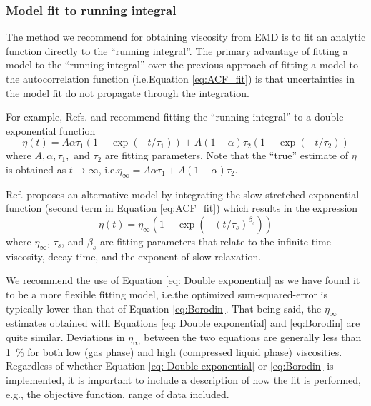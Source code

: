 \documentclass[9pt,bestpractices]{livecoms}
\providecommand{\DIFadd}[1]{{\protect\color{blue}\uwave{#1}}} %
\providecommand{\DIFaddbegin}{} %
\providecommand{\DIFaddend}{} %
\begin{document}
%
%

%

\subsubsection*{Model fit to running integral}

The method we recommend for obtaining viscosity from EMD is to fit an analytic function directly to the ``running integral''. The primary advantage of fitting a model to the ``running integral'' over the previous approach of fitting a model to the autocorrelation function (i.e.\DIFaddbegin \DIFadd{, }\DIFaddend Equation \ref{eq:ACF_fit}) is that uncertainties in the model fit do not propagate through the integration. 

For example, Refs. \cite{ReyCastro2006} and \cite{Zhang2015} recommend fitting the ``running integral'' to a double-exponential function \begin{equation} \label{eq: Double exponential}
\eta(t) = A \alpha \tau_1 \left(1-\exp{(-t/\tau_1)}\right) + A (1-\alpha) \tau_2 \left(1-\exp{(-t/\tau_2)}\right)
\end{equation}
where $A, \alpha, \tau_1, $ and $\tau_2$ are fitting parameters. Note that the ``true'' estimate of $\eta$ is obtained as $t \to \infty$, i.e.\DIFaddbegin \DIFadd{, }\DIFaddend $\eta_\infty = A \alpha \tau_1 + A (1-\alpha) \tau_2$. 

Ref. \cite{Borodin2009} proposes an alternative model by integrating the slow stretched-exponential function (second term in Equation \ref{eq:ACF_fit}) which results in the expression
\begin{equation} \label{eq:Borodin}
\eta(t) = \eta_\infty (1- \exp(-(t/\tau_s)^{\beta_s}))
\end{equation}
where $\eta_\infty$, $\tau_s$, and $\beta_s$ are fitting parameters that relate to the infinite-time viscosity, decay time, and the exponent of slow relaxation. 

We recommend the use of Equation \ref{eq: Double exponential} as we have found it to be a more flexible fitting model, i.e.\DIFaddbegin \DIFadd{, }\DIFaddend the optimized sum-squared-error is typically lower than that of Equation \ref{eq:Borodin}. That being said, the $\eta_{\infty}$ estimates obtained with Equations \ref{eq: Double exponential} and \ref{eq:Borodin} are quite similar. Deviations in $\eta_{\infty}$ between the two equations are generally less than 1~\% for both low (gas phase) and high (compressed liquid phase) viscosities. Regardless of whether Equation \ref{eq: Double exponential} or \ref{eq:Borodin} is implemented, it is important to include a description of how the fit is performed, e.g., the objective function, range of data included.
\end{document}
